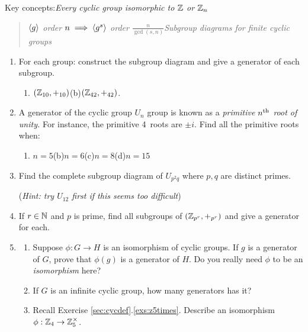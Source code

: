 \begin{exercises}
	Key concepts:\quad \emph{Every cyclic group isomorphic to $\mathbb{Z}$ or $\mathbb{Z}_n$}
	\begin{quote}
		\emph{$\left\langle g\right\rangle$ order $n\implies \left\langle g^s\right\rangle$ order $\frac n{\gcd(s,n)}$\qquad Subgroup diagrams for finite cyclic groups}
	\end{quote}
	
	
	\begin{enumerate}
		\item For each group: construct the subgroup diagram and give a generator of each subgroup.
		\begin{enumerate}
		  \item $(\mathbb{Z}_{10},+_{10})$\qquad\qquad (b)\lstsp $(\mathbb{Z}_{42},+_{42})$.
		\end{enumerate}
	  
	  
	  \item A generator of the cyclic group $U_n$ group is known as a \emph{primitive $n\textsuperscript{th}$ root of unity.} For instance, the primitive 4\th\ roots are $\pm i$. Find all the primitive roots when:
	  \begin{enumerate}
	    \item $n=5$\hfill (b)\lstsp $n=6$\hfill (c)\lstsp $n=8$\hfill (d)\lstsp $n=15$\hspace*{\fill}\hspace*{\fill}
	  \end{enumerate}
		
		
		\item Find the complete subgroup diagram of $U_{p^2q}$ where $p,q$ are distinct primes.\par
		(\emph{Hint: try $U_{12}$ first if this seems too difficult})
	  
	  
	  \item If $r\in\mathbb{N}$ and $p$ is prime, find all subgroups of $(\mathbb{Z}_{p^r},+_{p^r})$ and give a generator for each.
		
		
	  \item\begin{enumerate}
	    \item Suppose $\phi:G\to H$ is an isomorphism of cyclic groups. If $g$ is a generator of $G$, prove that $\phi(g)$ is a generator of $H$. Do you really need $\phi$ to be an \emph{isomorphism} here?
	  
	  	\item If $G$ is an infinite cyclic group, how many generators has it?
	  	
			\item Recall Exercise \ref*{sec:cycdef}.\ref{exs:z5times}. Describe an isomorphism $\phi:\mathbb{Z}_4\to\mathbb{Z}_5^\times$.
	  \end{enumerate} 
	  

\end{enumerate}
\end{exercises}
